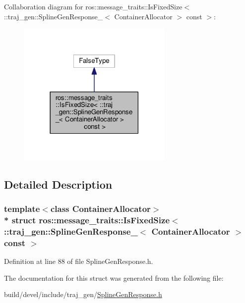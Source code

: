 Collaboration diagram for ros\+:\+:message\+\_\+traits\+:\+:Is\+Fixed\+Size$<$ \+:\+:traj\+\_\+gen\+:\+:Spline\+Gen\+Response\+\_\+$<$ Container\+Allocator $>$ const $>$\+:
\nopagebreak
\begin{figure}[H]
\begin{center}
\leavevmode
\includegraphics[width=213pt]{structros_1_1message__traits_1_1_is_fixed_size_3_01_1_1traj__gen_1_1_spline_gen_response___3_01_d564c81279ab9c36491c3eb77d83679a}
\end{center}
\end{figure}


\subsection{Detailed Description}
\subsubsection*{template$<$class Container\+Allocator$>$\\*
struct ros\+::message\+\_\+traits\+::\+Is\+Fixed\+Size$<$ \+::traj\+\_\+gen\+::\+Spline\+Gen\+Response\+\_\+$<$ Container\+Allocator $>$ const  $>$}



Definition at line 88 of file Spline\+Gen\+Response.\+h.



The documentation for this struct was generated from the following file\+:\begin{DoxyCompactItemize}
\item 
build/devel/include/traj\+\_\+gen/\hyperlink{_spline_gen_response_8h}{Spline\+Gen\+Response.\+h}\end{DoxyCompactItemize}
